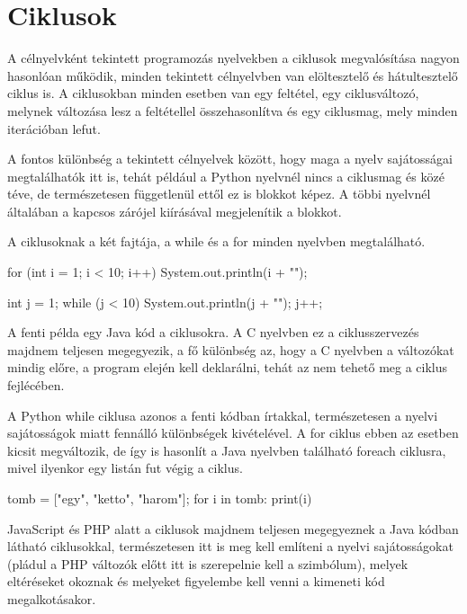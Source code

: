 
\section{Ciklusok}

A célnyelvként tekintett programozás nyelvekben a ciklusok megvalósítása nagyon hasonlóan működik, minden tekintett célnyelvben van elöltesztelő és hátultesztelő ciklus is. A ciklusokban minden esetben van egy feltétel, egy ciklusváltozó, melynek változása lesz a feltétellel összehasonlítva és egy ciklusmag, mely minden iterációban lefut.

A fontos különbség a tekintett célnyelvek között, hogy maga a nyelv sajátosságai megtalálhatók itt is, tehát például a Python nyelvnél nincs a ciklusmag { és } közé téve, de természetesen függetlenül ettől ez is blokkot képez. A többi nyelvnél általában a kapcsos zárójel kiírásával megjelenítik a blokkot.

A ciklusoknak a két fajtája, a while és a for minden nyelvben megtalálható.

\begin{cpp}
	for (int i = 1; i < 10; i++) {
		System.out.println(i + "\n");
	}

	int j = 1;
	while (j < 10) {
		System.out.println(j + "\n");
		j++;
	}
\end{cpp}

A fenti példa egy Java kód a ciklusokra. A C nyelvben ez a ciklusszervezés majdnem teljesen megegyezik, a fő különbség az, hogy a C nyelvben a változókat mindig előre, a program elején kell deklarálni, tehát az nem tehető meg a ciklus fejlécében.

A Python while ciklusa azonos a fenti kódban írtakkal, természetesen a nyelvi sajátosságok miatt fennálló különbségek kivételével. A for ciklus ebben az esetben kicsit megváltozik, de így is hasonlít a Java nyelvben található foreach ciklusra, mivel ilyenkor egy listán fut végig a ciklus.

\begin{cpp}
	tomb = ["egy", "ketto", "harom"];
	for i in tomb:
		print(i)
\end{cpp}

JavaScript és PHP alatt a ciklusok majdnem teljesen megegyeznek a Java kódban látható ciklusokkal, természetesen itt is meg kell említeni a nyelvi sajátosságokat (pládul a PHP változók előtt itt is szerepelnie kell a \textdollar szimbólum), melyek eltéréseket okoznak és melyeket figyelembe kell venni a kimeneti kód megalkotásakor.

